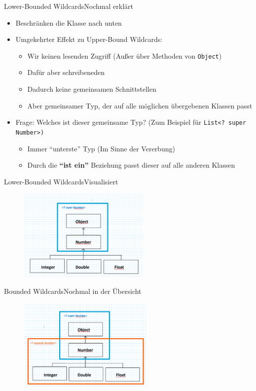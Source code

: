 \begin{frame}{Lower-Bounded Wildcards}{Nochmal erklärt}
    \begin{itemize}[<+->]
        \item Beschränken die Klasse nach unten
        \item Umgekehrter Effekt zu Upper-Bound Wildcards:
        \begin{itemize}
            \item Wir keinen lesenden Zugriff (Außer über Methoden von \texttt{Object})
            \item Dafür aber schreibeneden
            \item Dadurch keine gemeinsamen Schnittstellen
            \item Aber gemeinsamer Typ, der auf alle möglichen übergebenen Klassen passt
        \end{itemize}
        \item Frage: Welches ist dieser gemeinsame Typ? (Zum Beispiel für \texttt{List<? super Number>)}
        \begin{itemize}[<+-|handout:0>]
            \item Immer "`unterste"' Typ (Im Sinne der Vererbung)
            \item Durch die \textbf{"`ist ein"'} Beziehung passt dieser auf alle anderen Klassen
        \end{itemize}
    \end{itemize}
\end{frame}

\begin{frame}{Lower-Bounded Wildcards}{Visualisiert}
    \begin{figure}
        \centering
        \includegraphics[height=4.5cm]{graph/lower_wildcard}
    \end{figure}
\end{frame}

\begin{frame}{Bounded Wildcards}{Nochmal in der Übersicht}
    \begin{figure}
        \centering
        \includegraphics[height=4.5cm]{graph/wildcard_bound}
    \end{figure}
\end{frame}

